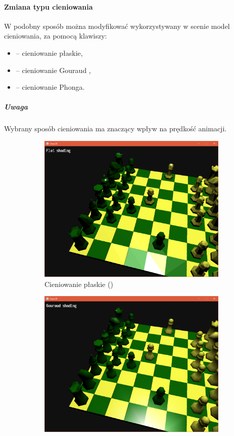 \documentclass[10pt,a4paper]{article}
\begin{document}
\paragraph{Zmiana typu cieniowania}
W podobny sposób można modyfikować wykorzystywany w scenie model cieniowania, za pomocą klawiszy:
\begin{itemize}
	\item {} -- cieniowanie płaskie,
	\item {} -- cieniowanie Gouraud \cite{gouraud71},
	\item {} -- cieniowanie Phonga.
\end{itemize}
\subparagraph{Uwaga} Wybrany sposób cieniowania ma znaczący wpływ na prędkość animacji.

\begin{figure}[H]
	\centering
	\begin{subfigure}[b]{0.3\textwidth}
		\includegraphics[width=\textwidth]{screenshots/08_flat.png}
		\caption{Cieniowanie płaskie ()}
	\end{subfigure}
	\begin{subfigure}[b]{0.3\textwidth}
		\includegraphics[width=\textwidth]{screenshots/09_gouraud.png}

\end{subfigure}
\end{figure}
\end{document}
